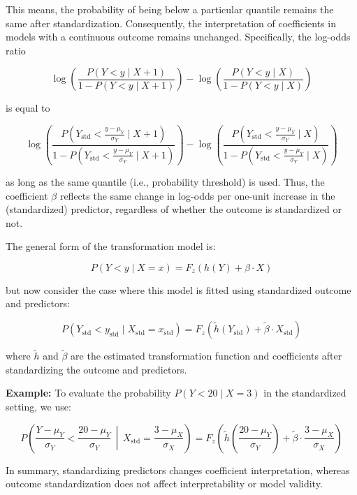 This means, the probability of being below a particular quantile remains the same after standardization. Consequently, the interpretation of coefficients in models with a continuous outcome remains unchanged. Specifically, the log-odds ratio


\[
\log \left( \frac{P(Y < y \mid X + 1)}{1 - P(Y < y \mid X + 1)} \right) -
\log \left( \frac{P(Y < y \mid X)}{1 - P(Y < y \mid X)} \right)
\]

is equal to

\[
\log \left( \frac{P\left(Y_{\text{std}} < \frac{y - \mu_Y}{\sigma_Y} \mid X + 1\right)}{1 - P\left(Y_{\text{std}} < \frac{y - \mu_Y}{\sigma_Y} \mid X + 1\right)} \right) -
\log \left( \frac{P\left(Y_{\text{std}} < \frac{y - \mu_Y}{\sigma_Y} \mid X\right)}{1 - P\left(Y_{\text{std}} < \frac{y - \mu_Y}{\sigma_Y} \mid X\right)} \right)
\]

as long as the same quantile (i.e., probability threshold) is used. Thus, the coefficient $\beta$ reflects the same change in log-odds per one-unit increase in the (standardized) predictor, regardless of whether the outcome is standardized or not.


The general form of the transformation model is:


\[
P(Y < y \mid X = x) = F_z\left(h(Y) + \beta \cdot X\right)
\]

but now consider the case where this model is fitted using standardized outcome and predictors:

\[
P(Y_{\text{std}} < y_{\text{std}} \mid X_{\text{std}} = x_{\text{std}}) = F_z\left(\tilde{h}(Y_{\text{std}}) + \tilde{\beta} \cdot X_{\text{std}}\right)
\]


where $\tilde{h}$ and $\tilde{\beta}$ are the estimated transformation function and coefficients after standardizing the outcome and predictors.



\textbf{Example:} To evaluate the probability \( P(Y < 20 \mid X = 3) \) in the standardized setting, we use:


\[
P\left(\frac{Y - \mu_Y}{\sigma_Y} < \frac{20 - \mu_Y}{\sigma_Y} \,\middle|\, X_{\text{std}} = \frac{3 - \mu_X}{\sigma_X} \right)
= F_z\left(\tilde{h}\left(\frac{20 - \mu_Y}{\sigma_Y}\right) + \tilde{\beta} \cdot \frac{3 - \mu_X}{\sigma_X} \right)
\]

\medskip


In summary, standardizing predictors changes coefficient interpretation, whereas outcome standardization does not affect interpretability or model validity.





